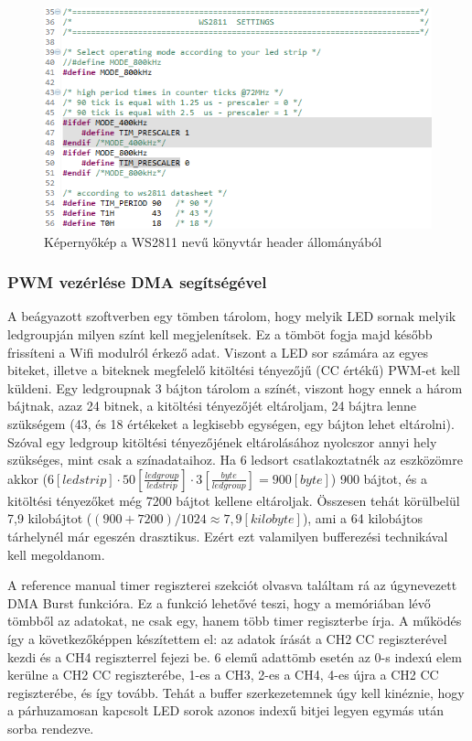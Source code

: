 \documentclass[../main.tex]{subfiles}
\begin{document}
            \begin{figure}[h!]
                \centering
                    \includegraphics[width=12cm]{mbed_res/ws2811_timing_values}
                \caption{Képernyőkép a WS2811 nevű könyvtár header állományából}
                \label{fig:ws2811_timing_values}
            \end{figure}
         
        \subsubsection{PWM vezérlése DMA segítségével}  
             A beágyazott szoftverben egy tömben tárolom, hogy melyik LED sornak melyik ledgroupján milyen színt kell megjelenítsek. Ez a tömböt fogja majd később frissíteni a Wifi modulról érkező adat. Viszont a LED sor számára az egyes biteket, illetve a biteknek megfelelő kitöltési tényezőjű (CC értékű) PWM-et kell küldeni. Egy ledgroupnak 3 bájton tárolom a színét, viszont hogy ennek a három bájtnak, azaz 24 bitnek, a kitöltési tényezőjét eltároljam, 24 bájtra lenne szükségem (43, és 18 értékeket a legkisebb egységen, egy bájton lehet eltárolni). Szóval egy ledgroup kitöltési tényezőjének eltárolásához nyolcszor annyi hely szükséges, mint csak a színadataihoz. Ha 6 ledsort csatlakoztatnék az eszközömre akkor ($ 6[ledstrip]\cdot 50 [\frac{ledgroup}{ledstrip}] \cdot 3 [\frac{byte}{ledgroup}] = 900 [byte]$) 900 bájtot, és a kitöltési tényezőket még 7200 bájtot kellene eltároljak. Összesen tehát körülbelül 7,9 kilobájtot ($ (900+7200)/1024 \approx 7,9[kilobyte]$), ami a 64 kilobájtos tárhelynél már egeszén drasztikus. Ezért ezt valamilyen bufferezési technikával kell megoldanom.
             
             A reference manual timer regiszterei szekciót olvasva találtam rá az úgynevezett DMA Burst funkcióra. Ez a funkció lehetővé teszi, hogy a memóriában lévő tömbből az adatokat, ne csak egy, hanem több timer regiszterbe írja. A működés így a következőképpen készítettem el: az adatok írását a CH2 CC regiszterével kezdi és a CH4 regiszterrel fejezi be. 6 elemű adattömb esetén az 0-s indexú elem kerülne a CH2 CC regiszterébe, 1-es a CH3, 2-es a CH4, 4-es újra a CH2 CC regiszterébe, és így tovább. Tehát a buffer szerkezetemnek úgy kell kinéznie, hogy a párhuzamosan kapcsolt LED sorok azonos indexű bitjei legyen egymás után sorba rendezve.
             
\end{document}
